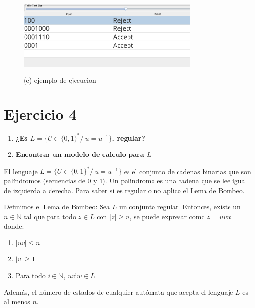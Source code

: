 \documentclass{article}
\begin{document}
        \newpage
        \begin{figure}[!h]
            \centering
            \includegraphics[width=0.8\textwidth]{./Imagenes/image24.png}
            \label{fig:label4}
            \caption*{(e) ejemplo de ejecucion}
        \end{figure}

        


        \newpage


        \section*{Ejercicio 4}
        \begin{enumerate}
            \item \textbf{¿Es $L = \{ U \in \{0, 1\}^* /\  u=u^{-1} \}$. regular? }
            \item \textbf{Encontrar un modelo de calculo para $L$ }
        \end{enumerate}
        El lenguaje $L = \{ U \in \{0, 1\}^* /\  u=u^{-1} \}$ es el conjunto de cadenas binarias que son palíndromos (secuencias de 0 y 1). Un palindromo es 
        una cadena que se lee igual de izquierda a derecha. Para saber si es regular o no aplico el Lema de Bombeo.
        \vspace{\baselineskip} %

        Definimos el Lema de Bombeo: Sea \( L \) un conjunto regular. Entonces, existe un \( n \in \mathbb{N} \) tal que para todo \( z \in L \) con \( |z| \geq n \), se puede expresar como \( z = u v w \) donde:
        \begin{enumerate}
          \item \( |uv| \leq n \)
          \item \( |v| \geq 1 \)
          \item Para todo \( i \in \mathbb{N} \), \( uv^iw \in L \)
        \end{enumerate}
        Además, el número de estados de cualquier autómata que acepta el lenguaje \( L \) es al menos \( n \).
        \vspace{\baselineskip} %
\end{document}
